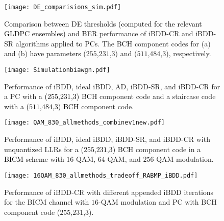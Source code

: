 \documentclass[journal]{IEEEtran}
\newcommand{\GL}{\textcolor{black}}
\newcommand{\GLC}[1]{\textcolor{black}{\textbf{\textit{#1}}}}
\begin{document}
\begin{figure}[t] \centering 
	\texttt{[image: DE\_comparisions\_sim.pdf]}  
	\caption{Comparison between DE \GL{thresholds (computed for the relevant GLDPC ensembles)} and \GL{BER} performance of iBDD-CR and iBDD-SR algorithms \GL{applied to PCs}. The \GL{BCH} component code\GL{s} for (a) and (b) \GL{have parameters} ($255$,$231$,$3$) and ($511$,$484$,$3$), respectively.}  \vspace{-2ex}
	\label{DEsimt3} 
\end{figure} 


\begin{figure}[t] \centering 
	\texttt{[image: Simulationbiawgn.pdf]}  
	\caption{Performance of iBDD, ideal iBDD, AD, iBDD-SR, and iBDD-CR for a PC with \GL{a ($255$,$231$,$3$) BCH} component code  and a staircase code with \GL{a ($511$,$484$,$3$) BCH} component code.}  \vspace{-2ex}
	\label{percompt3} 
\end{figure} 

\begin{figure*}[t] \centering 
	\texttt{[image: QAM\_830\_allmethods\_combinev1new.pdf]}  
	\caption{Performance of iBDD, ideal iBDD, iBDD-SR, and iBDD-CR with \GL{unquantized} LLRs for \GL{a ($255$,$231$,$3$) BCH} component code  in \GL{a BICM scheme} with $16$-QAM, $64$-QAM, and $256$-QAM modulation. %
	}  %
	\label{QAM_mod_all_schemes} 
\end{figure*} 



\begin{figure}[t] \centering 
	\texttt{[image: 16QAM\_830\_allmethods\_tradeoff\_RABMP\_iBDD.pdf]}  
	\caption{Performance of iBDD-CR with different appended iBDD iterations for the BICM channel with $16$-QAM modulation and PC with BCH component code ($255$,$231$,$3$). %
	}  \vspace{-2ex}
	\label{tradeoff_RA_BMP} 
\end{figure} 
\end{document}
